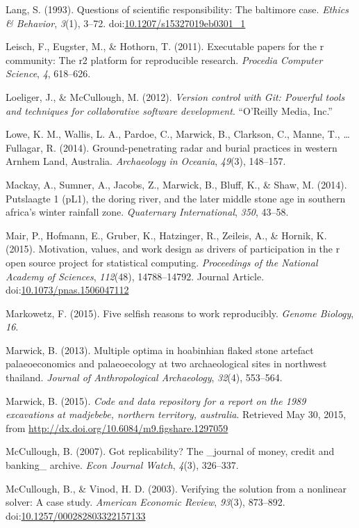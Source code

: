 \documentclass[american,man]{apa6}
\begin{document}
Lang, S. (1993). Questions of scientific responsibility: The baltimore
case. \emph{Ethics \& Behavior}, \emph{3}(1), 3--72.
doi:\href{http://dx.doi.org/10.1207/s15327019eb0301_1}{10.1207/s15327019eb0301\_1}

Leisch, F., Eugster, M., \& Hothorn, T. (2011). Executable papers for
the r community: The r2 platform for reproducible research.
\emph{Procedia Computer Science}, \emph{4}, 618--626.

Loeliger, J., \& {McCullough}, M. (2012). \emph{Version control with
Git: Powerful tools and techniques for collaborative software
development}. ``O'Reilly Media, Inc.''

Lowe, K. M., Wallis, L. A., Pardoe, C., Marwick, B., Clarkson, C.,
Manne, T., \ldots{} Fullagar, R. (2014). Ground-penetrating radar and
burial practices in western Arnhem Land, Australia. \emph{Archaeology in
Oceania}, \emph{49}(3), 148--157.

Mackay, A., Sumner, A., Jacobs, Z., Marwick, B., Bluff, K., \& Shaw, M.
(2014). Putslaagte 1 (pL1), the doring river, and the later middle stone
age in southern africa's winter rainfall zone. \emph{Quaternary
International}, \emph{350}, 43--58.

Mair, P., Hofmann, E., Gruber, K., Hatzinger, R., Zeileis, A., \&
Hornik, K. (2015). Motivation, values, and work design as drivers of
participation in the r open source project for statistical computing.
\emph{Proceedings of the National Academy of Sciences}, \emph{112}(48),
14788--14792. Journal Article.
doi:\href{http://dx.doi.org/10.1073/pnas.1506047112}{10.1073/pnas.1506047112}

Markowetz, F. (2015). Five selfish reasons to work reproducibly.
\emph{Genome Biology}, \emph{16}.

Marwick, B. (2013). Multiple optima in hoabinhian flaked stone artefact
palaeoeconomics and palaeoecology at two archaeological sites in
northwest thailand. \emph{Journal of Anthropological Archaeology},
\emph{32}(4), 553--564.

Marwick, B. (2015). \emph{Code and data repository for a report on the
1989 excavations at madjebebe, northern territory, australia}. Retrieved
May 30, 2015, from \url{http://dx.doi.org/10.6084/m9.figshare.1297059}

{McCullough}, B. (2007). Got replicability? The \_journal of money,
credit and banking\_ archive. \emph{Econ Journal Watch}, \emph{4}(3),
326--337.

{McCullough}, B., \& Vinod, H. D. (2003). Verifying the solution from a
nonlinear solver: A case study. \emph{American Economic Review},
\emph{93}(3), 873--892.
doi:\href{http://dx.doi.org/10.1257/000282803322157133}{10.1257/000282803322157133}
\end{document}
